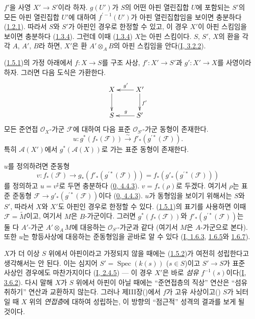 $f'$을 사영 $X'\to S'$이라 하자. $g(U')$가 $S$의 어떤 아핀
열린집합 $U$에 포함되는 $S'$의 모든 아핀 열린집합 $U'$에 대하여
$f^{\prime-1}(U')$가 아핀 열린집합임을 보이면 충분하다
(\hyperref[II.1.2.1-ko]{1.2.1}). 따라서 $S$와 $S'$가 아핀인 경우로
한정할 수 있고, 이 경우 $X'$이 아핀 스킴임을 보이면 충분하다
(\hyperref[II.1.3.4-ko]{1.3.4}). 그런데 이때
(\hyperref[II.1.3.4-ko]{1.3.4}) $X$는 아핀 스킴이다. $S$, $S'$, $X$의
환을 각각 $A$, $A'$, $B$라 하면, $X'$은 환 $A'\otimes_A B$의 아핀
스킴임을 안다(\hyperref[I.3.2.2-ko]{I, 3.2.2}).

\begin{env}[1.5.2]
\label{II.1.5.2-ko}
(\hyperref[II.1.5.1-ko]{1.5.1})의 가정 아래에서 $f:X\to S$를 구조
사상, $f':X'\to S'$과 $g':X'\to X$를 사영이라 하자. 그러면 다음
도식은 가환한다.
\[
  \xymatrix{
    X\ar[d] & X'\ar[l]_{g'}\ar[d]^{f'}\\
    S & S'\ar[l]_g
  }
\]
모든 준연접 $\mathcal{O}_X$-가군 $\mathcal{F}$에 대하여 다음 표준
$\mathcal{O}_{S'}$-가군 동형이 존재한다.
\[
  u:g^*(f_*(\mathcal{F}))\xrightarrow{\sim}
  f'_*(g^{\prime*}(\mathcal{F})).
  \tag{1.5.2.1}\label{II.1.5.2.1-ko}
\]
특히 $\mathcal{A}(X')$에서 $g^*(\mathcal{A}(X))$로 가는 표준 동형이
존재한다.
\end{env}

$u$를 정의하려면 준동형
\[
  v:f_*(\mathcal{F})\longrightarrow
  g_*(f'_*(g^{\prime*}(\mathcal{F})))
  =f_*(g'_*(g^{\prime*}(\mathcal{F})))
\]
를 정의하고 $u=v^\sharp$로 두면 충분하다
(\hyperref[0.4.4.3-ko]{0, 4.4.3}). $v=f_*(\rho)$로 두겠다. 여기서
$\rho$는 표준 준동형
$\mathcal{F}\to g'_*(g^{\prime*}(\mathcal{F}))$이다
(\hyperref[0.4.4.3-ko]{0, 4.4.3}). $u$가 동형임을 보이기 위해서는
$S$와 $S'$, 따라서 $X$와 $X'$도 아핀인 경우로 한정할 수 있다.
(\hyperref[II.1.5.1-ko]{1.5.1})의 표기를 사용하면 이때
$\mathcal{F}=\widetilde{M}$이고, 여기서 $M$은 $B$-가군이다. 그러면
$g^*(f_*(\mathcal{F}))$와 $f'_*(g^{\prime*}(\mathcal{F}))$는 둘 다
$A'$-가군 $A'\otimes_A M$에 대응하는 $\mathcal{O}_{S'}$-가군과 같다
(여기서 $M$은 $A$-가군으로 본다). 또한 $u$는 항등사상에 대응하는
준동형임을 곧바로 알 수 있다
(\hyperref[I.1.6.3-ko]{I, 1.6.3},
\hyperref[I.1.6.5-ko]{1.6.5}와 \hyperref[I.1.6.7-ko]{1.6.7}).

\begin{env}[1.5.3]
\label{II.1.5.3-ko}
$X$가 더 이상 $S$ 위에서 아핀이라고 가정되지 않을 때에는
(\hyperref[II.1.5.2-ko]{1.5.2})가 여전히 성립한다고 생각해서는 안
된다. 이는 심지어 $S'=\operatorname{Spec}(k(s))$ ($s\in S$)이고
$S'\to S$가 표준 사상인 경우에도 마찬가지이다
(\hyperref[I.2.4.5-ko]{I, 2.4.5}) --- 이 경우 $X'$은 바로
\emph{섬유} $f^{-1}(s)$이다(\hyperref[I.3.6.2-ko]{I, 3.6.2}). 다시
말해 $X$가 $S$ 위에서 아핀이 아닐 때에는
``준연접층의 직상'' 연산은 ``섬유 취하기'' 연산과 교환하지 않는다.
그러나 제III장()에서 $f$가 고유
사상이고() $S$가 뇌터일 때 $X$ 위의
\emph{연접층}에 대하여 성립하는, 이 방향의 ``점근적'' 성격의 결과를
보게 될 것이다.
\end{env}

